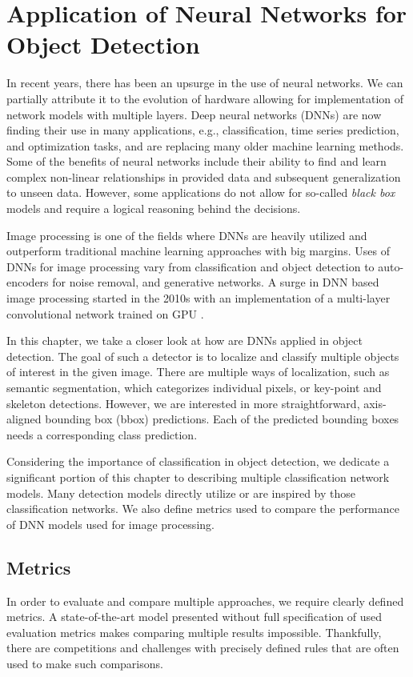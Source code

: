 \chapter{Application of Neural Networks for Object Detection}
\label{chap:nns}
In recent years, there has been an upsurge in the use of neural networks. We can partially attribute it to the evolution of hardware allowing for implementation of network models with multiple layers. Deep neural networks (DNNs) are now finding their use in many applications, e.g., classification, time series prediction, and optimization tasks, and are replacing many older machine learning methods. Some of the benefits of neural networks include their ability to find and learn complex non-linear relationships in provided data and subsequent generalization to unseen data. However, some applications do not allow for so-called \textit{black box} models and require a logical reasoning behind the decisions.

Image processing is one of the fields where DNNs are heavily utilized and outperform traditional machine learning approaches with big margins. Uses of DNNs for image processing vary from classification and object detection to auto-encoders for noise removal, and generative networks. A surge in DNN based image processing started in the 2010s with an implementation of a multi-layer convolutional network trained on GPU \cite{bib:deepOnGpu}. 

In this chapter, we take a closer look at how are DNNs applied in object detection. The goal of such a detector is to localize and classify multiple objects of interest in the given image. There are multiple ways of localization, such as semantic segmentation, which categorizes individual pixels, or key-point and skeleton detections. However, we are interested in more straightforward, axis-aligned bounding box (bbox) predictions. Each of the predicted bounding boxes needs a corresponding class prediction.

Considering the importance of classification in object detection, we dedicate a significant portion of this chapter to describing multiple classification network models. Many detection models directly utilize or are inspired by those classification networks. We also define metrics used to compare the performance of DNN models used for image processing.

\section{Metrics}
In order to evaluate and compare multiple approaches, we require clearly defined metrics. A state-of-the-art model presented without full specification of used evaluation metrics makes comparing multiple results impossible. Thankfully, there are competitions and challenges with precisely defined rules that are often used to make such comparisons. 

